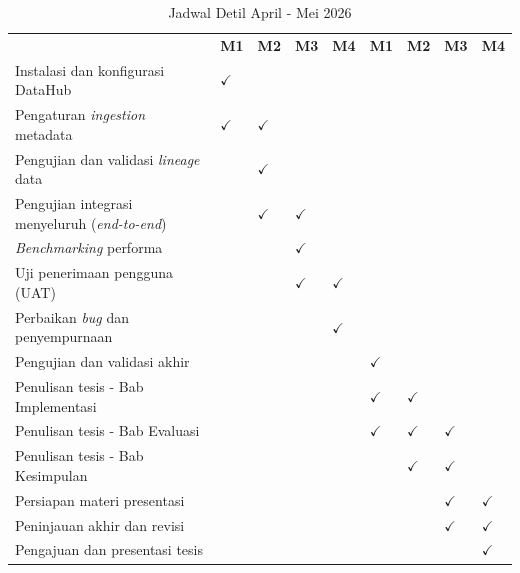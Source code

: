 \begin{table}[H]
\caption{Jadwal Detil April - Mei 2026}
\label{tab:schedule_apr_may}
\footnotesize
\begin{tabular}{|>{\raggedright\arraybackslash}m{6cm}|>{\centering\arraybackslash}m{0.5cm}|>{\centering\arraybackslash}m{0.5cm}|>{\centering\arraybackslash}m{0.5cm}|>{\centering\arraybackslash}m{0.5cm}|>{\centering\arraybackslash}m{0.5cm}|>{\centering\arraybackslash}m{0.5cm}|>{\centering\arraybackslash}m{0.5cm}|>{\centering\arraybackslash}m{0.5cm}|}
\hline
\multirow{2}{6cm}{\centering\textbf{Kegiatan}} & \multicolumn{4}{c|}{\textbf{April 2026}} & \multicolumn{4}{c|}{\textbf{Mei 2026}} \\
\cline{2-9} & \textbf{M1} & \textbf{M2} & \textbf{M3} & \textbf{M4} & \textbf{M1} & \textbf{M2} & \textbf{M3} & \textbf{M4} \\
\hline
Instalasi dan konfigurasi DataHub & $\checkmark$ & & & & & & & \\
\hline
Pengaturan \textit{ingestion} metadata & $\checkmark$ & $\checkmark$ & & & & & & \\
\hline
Pengujian dan validasi \textit{lineage} data & & $\checkmark$ & & & & & & \\
\hline
Pengujian integrasi menyeluruh (\textit{end-to-end}) & & $\checkmark$ & $\checkmark$ & & & & & \\
\hline
\textit{Benchmarking} performa & & & $\checkmark$ & & & & & \\
\hline
Uji penerimaan pengguna (UAT) & & & $\checkmark$ & $\checkmark$ & & & & \\
\hline
Perbaikan \textit{bug} dan penyempurnaan & & & & $\checkmark$ & & & & \\
\hline
Pengujian dan validasi akhir & & & & & $\checkmark$ & & & \\
\hline
Penulisan tesis - Bab Implementasi & & & & & $\checkmark$ & $\checkmark$ & & \\
\hline
Penulisan tesis - Bab Evaluasi & & & & & $\checkmark$ & $\checkmark$ & $\checkmark$ & \\
\hline
Penulisan tesis - Bab Kesimpulan & & & & & & $\checkmark$ & $\checkmark$ & \\
\hline
Persiapan materi presentasi & & & & & & & $\checkmark$ & $\checkmark$ \\
\hline
Peninjauan akhir dan revisi & & & & & & & $\checkmark$ & $\checkmark$ \\
\hline
Pengajuan dan presentasi tesis & & & & & & & & $\checkmark$ \\
\hline
\end{tabular}
\end{table}